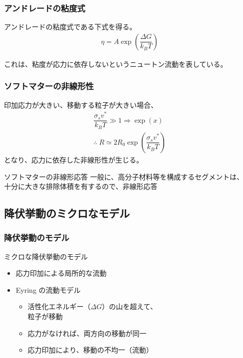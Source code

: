 \documentclass[10pt, dvipdfmx]{beamer}
\begin{document}
\begin{frame}
	\frametitle{アンドレードの粘度式}
	\large
	アンドレードの粘度式である下式を得る。
	\begin{align*}
	\eta = A \exp \left(\dfrac{\Delta G}{k_BT} \right)
	\end{align*}
	
	\large
	これは、粘度が応力に依存しないというニュートン流動を表している。
	
	\end{frame}
\begin{frame}
\frametitle{ソフトマターの非線形性}
\large
印加応力が大きい、移動する粒子が大きい場合、
\normalsize
\begin{align*}
\dfrac{\sigma_s v^*}{k_BT} \gg 1 \Rightarrow \exp(x) \\
\therefore \; R \simeq 2 R_0 \exp \left( \dfrac{ \sigma_s v^*}{k_BT} \right)
\end{align*}
\large
となり、応力に依存した非線形性が生じる。

\begin{alertblock}{ソフトマターの非線形応答}
一般に、高分子材料等を構成するセグメントは、\\
十分に大きな排除体積を有するので、非線形応答
\end{alertblock}

\end{frame}

\subsection{降伏挙動のミクロなモデル}

\begin{frame}
\frametitle{降伏挙動のモデル}

\Large
\begin{exampleblock}{ミクロな降伏挙動のモデル}
\begin{itemize}
\item
応力印加による局所的な流動
\item
Eyring の流動モデル
	\begin{itemize}
	\large
	\item
	活性化エネルギー（$\Delta G$）の山を超えて、\\粒子が移動
	\item
	応力がなければ、両方向の移動が同一
	\item
	応力印加により、移動の不均一（流動）
	\end{itemize}
\end{itemize}
\end{exampleblock}
\end{frame}
\end{document}
